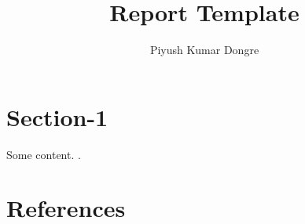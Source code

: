 \documentclass{article}
\title{Report Template}
\author{Piyush Kumar Dongre}
\begin{document}
\maketitle
\tableofcontents

\section{Section-1}

Some content.
\cite{wikibook}.

\section{References}

\printbibliography

\end{document}
